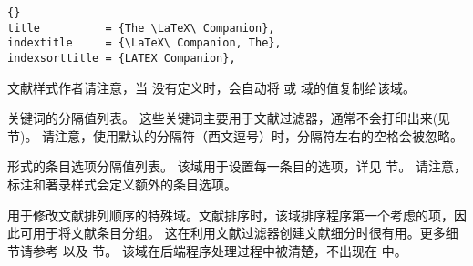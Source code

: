 \begin{fieldlist}
\begin{lstlisting}[style=bibtex]{}
title          = {The \LaTeX\ Companion},
indextitle     = {\LaTeX\ Companion, The},
indexsorttitle = {LATEX Companion},
\end{lstlisting}
%
文献样式作者请注意，当  没有定义时，\biblatex 会自动将  或  域的值复制给该域。




关键词的分隔值列表。
这些关键词主要用于文献过滤器，通常不会打印出来(见 节)。
请注意，使用默认的分隔符（西文逗号）时，分隔符左右的空格会被忽略。




\keyval 形式的条目选项分隔值列表。
该域用于设置每一条目的选项，详见  节。
请注意，标注和著录样式会定义额外的条目选项。




用于修改文献排列顺序的特殊域。文献排序时，该域排序程序第一个考虑的项，因此可用于将文献条目分组。
这在利用文献过滤器创建文献细分时很有用。更多细节请参考  以及  节。
该域在后端程序处理过程中被清楚，不出现在  中。


\end{fieldlist}
